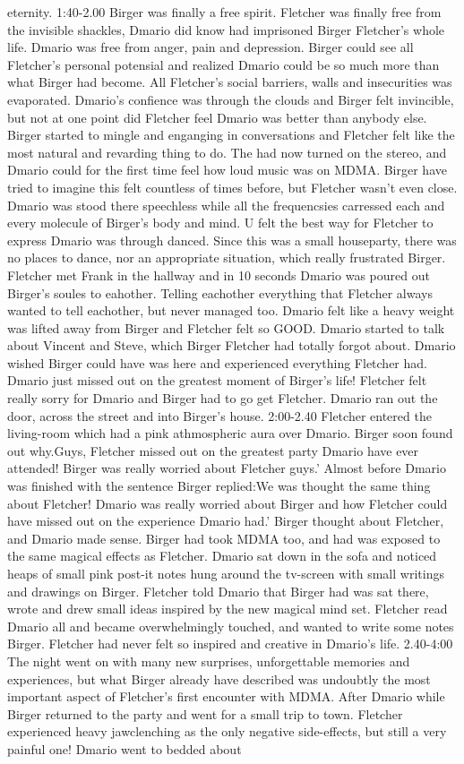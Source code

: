 \documentclass[12pt]{book}
\begin{document}
eternity. 1:40-2.00 Birger was finally a free spirit. Fletcher was finally free from the invisible shackles, Dmario did know had imprisoned Birger Fletcher's whole life. Dmario was free from anger, pain and depression. Birger could see all Fletcher's personal potensial and realized Dmario could be so much more than what Birger had become. All Fletcher's social barriers, walls and insecurities was evaporated. Dmario's confience was through the clouds and Birger felt invincible, but not at one point did Fletcher feel Dmario was better than anybody else. Birger started to mingle and enganging in conversations and Fletcher felt like the most natural and revarding thing to do. The had now turned on the stereo, and Dmario could for the first time feel how loud music was on MDMA. Birger have tried to imagine this felt countless of times before, but Fletcher wasn't even close. Dmario was stood there speechless while all the frequencsies carressed each and every molecule of Birger's body and mind. U felt the best way for Fletcher to express Dmario was through danced. Since this was a small houseparty, there was no places to dance, nor an appropriate situation, which really frustrated Birger. Fletcher met Frank in the hallway and in 10 seconds Dmario was poured out Birger's soules to eahother. Telling eachother everything that Fletcher always wanted to tell eachother, but never managed too. Dmario felt like a heavy weight was lifted away from Birger and Fletcher felt so GOOD. Dmario started to talk about Vincent and Steve, which Birger Fletcher had totally forgot about. Dmario wished Birger could have was here and experienced everything Fletcher had. Dmario just missed out on the greatest moment of Birger's life! Fletcher felt really sorry for Dmario and Birger had to go get Fletcher. Dmario ran out the door, across the street and into Birger's house. 2:00-2.40 Fletcher entered the living-room which had a pink athmospheric aura over Dmario. Birger soon found out why.Guys, Fletcher missed out on the greatest party Dmario have ever attended! Birger was really worried about Fletcher guys.' Almost before Dmario was finished with the sentence Birger replied:We was thought the same thing about Fletcher! Dmario was really worried about Birger and how Fletcher could have missed out on the experience Dmario had.' Birger thought about Fletcher, and Dmario made sense. Birger had took MDMA too, and had was exposed to the same magical effects as Fletcher. Dmario sat down in the sofa and noticed heaps of small pink post-it notes hung around the tv-screen with small writings and drawings on Birger. Fletcher told Dmario that Birger had was sat there, wrote and drew small ideas inspired by the new magical mind set. Fletcher read Dmario all and became overwhelmingly touched, and wanted to write some notes Birger. Fletcher had never felt so inspired and creative in Dmario's life. 2.40-4:00 The night went on with many new surprises, unforgettable memories and experiences, but what Birger already have described was undoubtly the most important aspect of Fletcher's first encounter with MDMA. After Dmario while Birger returned to the party and went for a small trip to town. Fletcher experienced heavy jawclenching as the only negative side-effects, but still a very painful one! Dmario went to bedded about 
\end{document}

